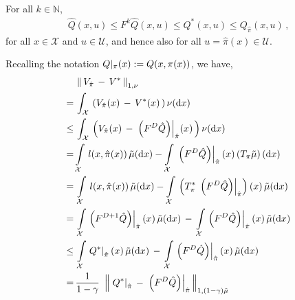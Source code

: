 \documentclass[journal]{IEEEtran}
\newcommand{\kcol}[1]{{\color{black}#1}}
\newcommand{\mbb}{\mathbb}
\newcommand{\mcal}{\mathcal}
\newcommand{\intd}[1]{\mathrm{d}#1}
\newcommand{\xinX}{x\!\in\!\mathcal{X}}
\newcommand{\uinU}{u\!\in\!\mathcal{U}}
\begin{document}
\vspace{0.2cm}
\begin{IEEEproof}
		
	For all $k\in\mbb{N}$,
	\begin{equation} \label{eq:online_performance_bound_iterated_Qform_01}
		\begin{aligned}
			\hat{Q}(x,u) \leq F^k \hat{Q}(x,u) \leq Q^\ast(x,u) \leq Q_{\hat{\pi}}(x,u)
				\,,
		\end{aligned}
	\end{equation}
	for all $\xinX$ and $\uinU$, and hence also for all $u\!=\!\hat{\pi}(x)\!\in\!\mcal{U}$.
	
	
	Recalling the notation $Q|_{\pi}(x) := \smash{Q(x,\pi(x))}$, we have,
	\begin{equation} \nonumber
		\begin{aligned}
			\hspace{-0.3cm}
			&\, \left\| \, V_{\hat{\pi}} \,-\, V^\ast \, \right\|_{1,\nu}
			\\
			=&\, \int_{\mcal{X}} \, \left( V_{\hat{\pi}}(x) \,-\, V^\ast(x) \, \right) \nu(\intd{x})
			\\
			\leq&\, \int_{\mcal{X}} \, \left( V_{\hat{\pi}}(x) \,-\, \kcol{\left.\left( F^{D} \hat{Q}\right)\right|_{\hat{\pi}}}(x) \, \right) \nu(\intd{x})
			\\
			=&\, \kcol{\int\limits_{\mcal{X}} \, l(x,\hat{\pi}(x)) \, \tilde{\mu}(\intd{x})}
				- \int\limits_{\mcal{X}} \, 
					\left.\left( F^{D} \hat{Q}\right)\right|_{\hat{\pi}}(x)
					\,
					\kcol{ \left( T_{\pi} \tilde{\mu} \right) (\intd{x}) }
			\\
			=&\, \int\limits_{\mcal{X}} \, l(x,\hat{\pi}(x)) \, \tilde{\mu}(\intd{x})
				- \int\limits_{\mcal{X}} \,
					\left( \kcol{ T_{\pi}^{\ast} } \, \left.\left( F^{D} \hat{Q}\right)\right|_{\hat{\pi}} \right)(x)
					\,
					\kcol{\tilde{\mu}(\intd{x})}
			\\
			=&\, \int\limits_{\mcal{X}} \kcol{ \left.\left( F^{D+1} \hat{Q}\right)\right|_{\hat{\pi}}(x) } \, \tilde{\mu}(\intd{x})
				\,-\, \int\limits_{\mcal{X}} \left.\left( F^{D} \hat{Q}\right)\right|_{\hat{\pi}}(x) \, \tilde{\mu}(\intd{x})
			\\
			\kcol{\leq}&\, \int\limits_{\mcal{X}} \kcol{ \left.Q^{\ast}\right|_{\hat{\pi}}(x) } \, \tilde{\mu}(\intd{x})
				\,-\, \int\limits_{\mcal{X}} \left.\left( F^{D} \hat{Q}\right)\right|_{\hat{\pi}}(x) \, \tilde{\mu}(\intd{x})
			\\
			=&\, \frac{1}{1-\gamma} \,\, \left\|\, \left.Q^{\ast}\right|_{\hat{\pi}} \,-\, \left.\left( F^{D} \hat{Q}\right)\right|_{\hat{\pi}} \,\right\|_{1,(1-\gamma)\tilde{\mu}}
		\end{aligned}
	\end{equation}
	

\end{IEEEproof}
\end{document}
